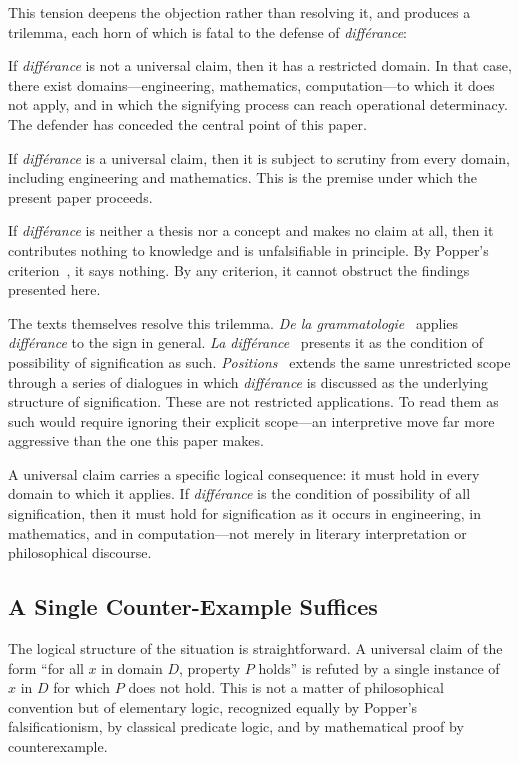 \documentclass[a4paper,twocolumn,11pt]{article}
\begin{document}
This tension deepens the objection rather than resolving it, and produces a trilemma, each horn of which is fatal to the defense of \emph{diff\'erance}:

If \emph{diff\'erance} is not a universal claim, then it has a restricted domain. In that case, there exist domains---engineering, mathematics, computation---to which it does not apply, and in which the signifying process can reach operational determinacy. The defender has conceded the central point of this paper.

If \emph{diff\'erance} is a universal claim, then it is subject to scrutiny from every domain, including engineering and mathematics. This is the premise under which the present paper proceeds.

If \emph{diff\'erance} is neither a thesis nor a concept and makes no claim at all, then it contributes nothing to knowledge and is unfalsifiable in principle. By Popper's criterion~\cite{Popper1934}, it says nothing. By any criterion, it cannot obstruct the findings presented here.

The texts themselves resolve this trilemma. \emph{De la grammatologie}~\cite{Derrida1967,Derrida1976} applies \emph{diff\'erance} to the sign in general. \emph{La diff\'erance}~\cite{Derrida1968,Derrida1982margins} presents it as the condition of possibility of signification as such. \emph{Positions}~\cite{Derrida1972,Derrida1981} extends the same unrestricted scope through a series of dialogues in which \emph{diff\'erance} is discussed as the underlying structure of signification. These are not restricted applications. To read them as such would require ignoring their explicit scope---an interpretive move far more aggressive than the one this paper makes.

A universal claim carries a specific logical consequence: it must hold in every domain to which it applies. If \emph{diff\'erance} is the condition of possibility of all signification, then it must hold for signification as it occurs in engineering, in mathematics, and in computation---not merely in literary interpretation or philosophical discourse.

\subsection{A Single Counter-Example Suffices}
\label{sec:counter-example}

The logical structure of the situation is straightforward. A universal claim of the form ``for all $x$ in domain $D$, property $P$ holds'' is refuted by a single instance of $x$ in $D$ for which $P$ does not hold. This is not a matter of philosophical convention but of elementary logic, recognized equally by Popper's falsificationism, by classical predicate logic, and by mathematical proof by counterexample.
\end{document}
